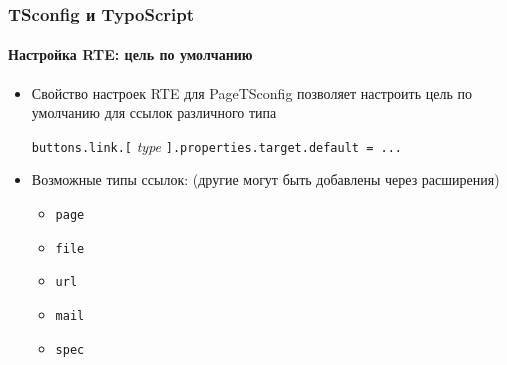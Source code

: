 \begin{frame}[fragile]
	\frametitle{TSconfig и TypoScript}
	\framesubtitle{Настройка RTE: цель по умолчанию}

	\begin{itemize}

		\item Свойство настроек RTE для PageTSconfig позволяет настроить цель по умолчанию для
		ссылок различного типа\newline

			\small
				\texttt{buttons.link.[}
				\textit{type}
				\texttt{].properties.target.default = ...}
			\normalsize\newline

		\item Возможные типы ссылок:\newline
			\small
				(другие могут быть добавлены через расширения)
			\normalsize

			\begin{itemize}
				\item \texttt{page}
				\item \texttt{file}
				\item \texttt{url}
				\item \texttt{mail}
				\item \texttt{spec}
			\end{itemize}
	\end{itemize}

\end{frame}

